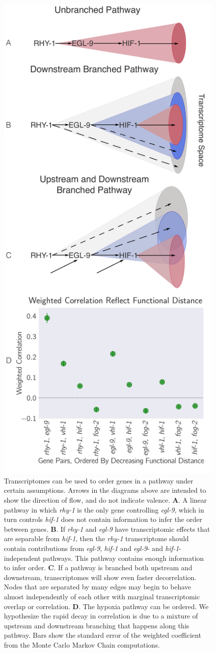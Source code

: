 \documentclass[9pt,twocolumn,twoside]{pnas-new}
\newcommand{\gene}[1]{\mbox{\emph{#1}}}
\begin{document}
\begin{figure}[tbhp]
  \centering
  \includegraphics[width=.4\textwidth]{../final_figs/decorrelation.pdf}
  \caption{
    Transcriptomes can be used to order genes in a pathway under
    certain assumptions. Arrows in the diagrams above are intended to show the
    direction of flow, and do not indicate valence. \textbf{A}. A linear pathway
    in which \gene{rhy-1} is the only gene controlling \gene{egl-9}, which in
    turn controls \gene{hif-1} does not contain information to infer the order
    between genes. \textbf{B}. If \gene{rhy-1} and \gene{egl-9} have
    transcriptomic effects that are separable from \gene{hif-1}, then the
    \gene{rhy-1} transcriptome should contain contributions from \gene{egl-9},
    \gene{hif-1} and \gene{egl-9}- and \gene{hif-1}-independent pathways. This
    pathway contains enough information to infer order. \textbf{C}. If a pathway
    is branched both upstream and downstream, transcriptomes will show even
    faster decorrelation. Nodes that are separated by many edges may begin to
    behave almost independently of each other with marginal transcriptomic
    overlap or correlation. \textbf{D}. The hypoxia pathway can be ordered. We
    hypothesize the rapid decay in correlation is due to a mixture of upstream
    and downstream branching that happens along this pathway. Bars show the
    standard error of the weighted coefficient from the Monte Carlo Markov Chain
    computations.
  }
\label{fig:decorrelation}
\end{figure}
\end{document}
